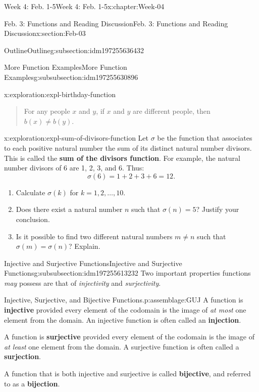\documentclass[oneside,10pt,]{book}
\newcommand{\terminology}[1]{\textbf{#1}}
\numberwithin{equation}{section}
\begin{document}
\begin{chapterptx}{Week 4: Feb. 1-5}{}{Week 4: Feb. 1-5}{}{}{x:chapter:Week-04}
\begin{sectionptx}{Feb. 3: Functions and Reading Discussion}{}{Feb. 3: Functions and Reading Discussion}{}{}{x:section:Feb-03}
\begin{subsectionptx}{Outline}{}{Outline}{}{}{g:subsection:idm197255636432}
\begin{subsubsectionptx}{More Function Examples}{}{More Function Examples}{}{}{g:subsubsection:idm197255630896}
\begin{exploration}{}{x:exploration:expl-birthday-function}
\begin{enumerate}
\begin{quote}
For any people \(x\) and \(y\), if \(x\) and \(y\) are different people, then \(b(x) \ne b(y)\).\end{quote}
%
\end{enumerate}
\end{exploration}%
\begin{exploration}{}{x:exploration:expl-sum-of-divisors-function}%
Let \(\sigma\) be the function that associates to each positive natural number the sum of its distinct natural number divisors. This is called the \terminology{sum of the divisors function}. For example, the natural number divisors of 6 are 1, 2, 3, and 6. Thus:%
\begin{equation*}
\sigma(6) = 1  + 2 + 3 +6 = 12.
\end{equation*}
%
%
\begin{enumerate}
\item{}Calculate \(\sigma(k)\) for \(k = 1, 2, \ldots, 10\).%
\item{}Does there exist a natural number \(n\) such that \(\sigma(n) = 5\)? Justify your conclusion.%
\item{}Is it possible to find two different natural numbers \(m \ne n\) such that \(\sigma(m) = \sigma(n)\)? Explain.%
\end{enumerate}
\end{exploration}%
\end{subsubsectionptx}
%
%
\typeout{************************************************}
\typeout{************************************************}
%
\begin{subsubsectionptx}{Injective and Surjective Functions}{}{Injective and Surjective Functions}{}{}{g:subsubsection:idm197255613232}
Two important properties functions \emph{may} possess are that of \emph{injectivity} and \emph{surjectivity}.%
\begin{assemblage}{Injective, Surjective, and Bijective Functions.}{p:assemblage:GUJ}%
A function is \terminology{injective} provided every element of the codomain is the image of \emph{at most} one element from the domain. An injective function is often called an \terminology{injection}.%
\par
A function is \terminology{surjective} provided every element of the codomain is the image of \emph{at least} one element from the domain. A surjective function is often called a \terminology{surjection}.%
\par
A function that is both injective and surjective is called \terminology{bijective}, and referred to as a \terminology{bijection}.%

\end{assemblage}
\end{subsubsectionptx}
\end{subsectionptx}
\end{sectionptx}
\end{chapterptx}
\end{document}
